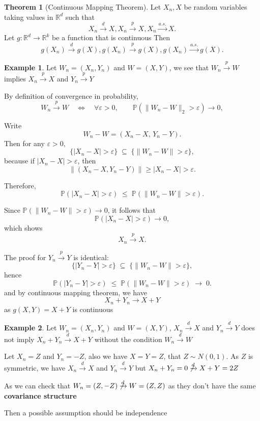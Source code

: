 \documentclass[11pt]{article}
\theoremstyle{definition}
\newtheorem{exmp}{Example}[section]
\newtheorem{theo}{Theorem}[section]
\begin{document}
\begin{theo}[Continuous Mapping Theorem]
Let $X_n, X$ be random variables taking values in $\mathbb{R}^d$ such that
\[
X_n \xrightarrow{d} X, X_n \xrightarrow{p} X, X_n \xrightarrow{a.s.} X.
\]
Let $g : \mathbb{R}^d \to \mathbb{R}^k$ be a function that is continuous
Then
\[
g(X_n) \xrightarrow{d} g(X), g(X_n) \xrightarrow{p} g(X), g(X_n) \xrightarrow{a.s.} g(X).
\]
\end{theo}
\begin{exmp}
    Let $W_n=(X_n,Y_n)$ and $W=(X,Y)$, we see that $W_n\xrightarrow{p} W$ implies $X_n\xrightarrow{p} X$ and $Y_n\xrightarrow{p} Y$

By definition of convergence in probability,
\[
W_n \xrightarrow{p} W
\quad \Longleftrightarrow \quad
\forall \varepsilon > 0, \qquad
\mathbb{P}\!\left( \| W_n - W \|_2 > \varepsilon \right) \to 0,
\]

Write
\[
W_n - W = (X_n - X, \, Y_n - Y).
\]
Then for any $\varepsilon > 0$,
\[
\{|X_n - X| > \varepsilon\}
\;\subseteq\;
\{ \| W_n - W \| > \varepsilon \},
\]
because if $|X_n - X| > \varepsilon$, then
\[
\| (X_n - X, Y_n - Y) \| \ge |X_n - X| > \varepsilon.
\]

Therefore,
\[
\mathbb{P}\!\left( |X_n - X| > \varepsilon \right)
\;\le\;
\mathbb{P}\!\left( \| W_n - W \| > \varepsilon \right).
\]

Since $\mathbb{P}( \| W_n - W \| > \varepsilon ) \to 0$, it follows that
\[
\mathbb{P}\!\left( |X_n - X| > \varepsilon \right) \to 0,
\]
which shows
\[
X_n \xrightarrow{p} X.
\]

The proof for $Y_n \xrightarrow{p} Y$ is identical:
\[
\{|Y_n - Y| > \varepsilon\}
\;\subseteq\;
\{ \| W_n - W \| > \varepsilon \},
\]
hence
\[
\mathbb{P}\!\left( |Y_n - Y| > \varepsilon \right)
\;\le\;
\mathbb{P}\!\left( \| W_n - W \| > \varepsilon \right)
\;\to\; 0.
\]
and by continuous mapping theorem, we have
\[
X_n + Y_n \rightarrow X + Y
\]
as $g(X, Y) = X+Y$ is continuous
\end{exmp}

\begin{exmp}
    Let $W_n=(X_n,Y_n)$ and $W=(X,Y)$, $X_n\xrightarrow{d} X$ and $Y_n\xrightarrow{d} Y$ does not imply $X_n+Y_n\xrightarrow{d}X+Y$ without the condition $W_n\xrightarrow{d}W$

    Let $X_n = Z$ and $Y_n = -Z$, also we have $X=Y=Z$, that $Z\sim N(0,1)$. As $Z$ is symmetric, we have $X_n\xrightarrow{d}X$ and $Y_n\xrightarrow{d}Y$ but $X_n+Y_n=0\not\xrightarrow{d}X+Y = 2Z$

    As we can check that $W_n = (Z, -Z) \not\xrightarrow{d} W=(Z, Z)$ as they don't have the same \textbf{covariance structure}

    Then a possible assumption should be independence
\end{exmp}
\end{document}
